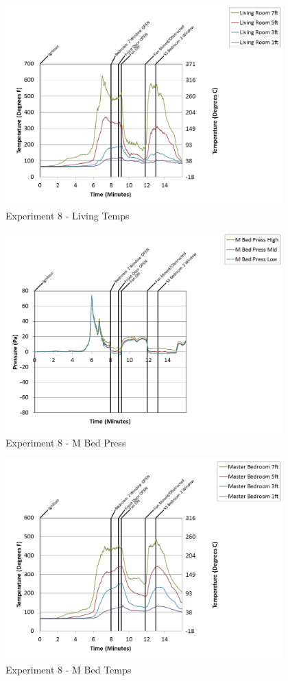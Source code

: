 \documentclass{article}
\begin{document}
\begin{appendices}
\begin{figure}[h!]
	\centering
	\includegraphics[height=3.05in]{0_Images/Results_Charts/Exp_8_Charts/LivingTemps.png}
	\caption{Experiment 8 - Living Temps}
\end{figure}

\clearpage

\begin{figure}[h!]
	\centering
	\includegraphics[height=3.05in]{0_Images/Results_Charts/Exp_8_Charts/MBedPress.png}
	\caption{Experiment 8 - M Bed Press}
\end{figure}


\begin{figure}[h!]
	\centering
	\includegraphics[height=3.05in]{0_Images/Results_Charts/Exp_8_Charts/MBedTemps.png}
	\caption{Experiment 8 - M Bed Temps}
\end{figure}


\end{appendices}
\end{document}
